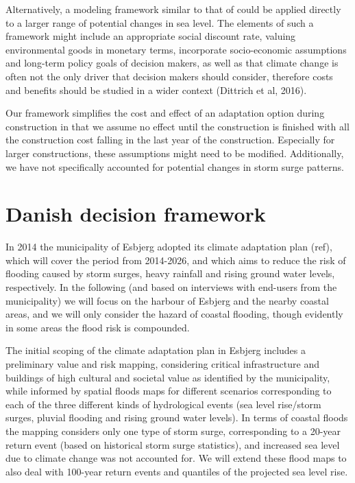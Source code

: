 \documentclass[draft,linenumbers]{agujournal}
\begin{document}
Alternatively, a modeling framework similar to that of \citet{Hallegatte&2013} could be applied directly to a larger range of potential changes in sea level. The elements of such a framework might include an appropriate social discount rate, valuing environmental goods in monetary terms, incorporate socio-economic assumptions and long-term policy goals of decision makers, as well as that climate change is often not the only driver that decision makers should consider, therefore costs and benefits should be studied in a wider context (Dittrich et al, 2016).

Our framework simplifies the cost and effect of an adaptation option during construction in that we assume no effect until the construction is finished with all the construction cost falling in the last year of the construction. Especially for larger constructions, these assumptions might need to be modified. Additionally, we have not specifically accounted for potential changes in storm surge patterns.


\section{Danish decision framework}
\label{decision_tools_PartII}
In 2014 the municipality of Esbjerg adopted its climate adaptation plan {\color{blue}(ref)}, which will cover the period from 2014-2026, and which aims to reduce the risk of flooding caused by storm surges, heavy rainfall and rising ground water levels, respectively. In the following (and based on interviews with end-users from the municipality) we will focus on the harbour of Esbjerg and the nearby coastal areas, and we will only consider the hazard of coastal flooding, though evidently in some areas the flood risk is compounded. 

The initial scoping of the climate adaptation plan in Esbjerg includes a preliminary value and risk mapping, considering critical infrastructure and buildings of high cultural and societal value as identified by the municipality, while informed by spatial floods maps for different scenarios corresponding to each of the three different kinds of hydrological events (sea level rise/storm surges, pluvial flooding and rising ground water levels). In terms of coastal floods the mapping considers only one type of storm surge, corresponding to a 20-year return event (based on historical storm surge statistics), and increased sea level due to climate change was not accounted for. We will extend these flood maps to also deal with 100-year return events and quantiles of the projected sea level rise.
\end{document}
